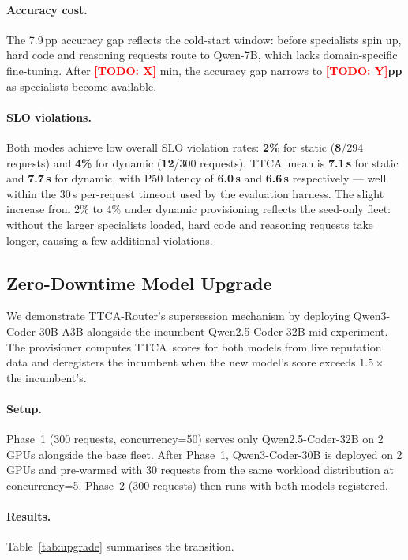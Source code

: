 \documentclass[11pt]{article}
\newcommand{\sysname}{TTCA-Router\xspace}
\newcommand{\ttca}{\textsc{TTCA}\xspace}
\newcommand{\result}[1]{\textbf{#1}}
\newcommand{\todo}[1]{\textcolor{red}{[TODO: #1]}}
\begin{document}
\paragraph{Accuracy cost.}
The 7.9\,pp accuracy gap reflects the cold-start window:
before specialists spin up, hard code and reasoning requests
route to Qwen-7B, which lacks domain-specific fine-tuning.
After \result{\todo{X}} min, the accuracy gap narrows to
\result{\todo{Y}pp} as specialists become available.

\paragraph{SLO violations.}
Both modes achieve low overall SLO violation rates:
\result{2\%} for static (\result{8}/294 requests) and \result{4\%} for dynamic
(\result{12}/300 requests).
\ttca\ mean is \result{7.1\,s} for static and \result{7.7\,s} for dynamic,
with P50 latency of \result{6.0\,s} and \result{6.6\,s} respectively —
well within the 30\,s per-request timeout used by the evaluation harness.
The slight increase from 2\% to 4\% under dynamic provisioning
reflects the seed-only fleet: without the larger specialists loaded,
hard code and reasoning requests take longer, causing a few additional violations.

\subsection{Zero-Downtime Model Upgrade}
\label{sec:eval:upgrade}

We demonstrate \sysname's supersession mechanism by deploying
Qwen3-Coder-30B-A3B alongside the incumbent Qwen2.5-Coder-32B
mid-experiment.  The provisioner computes \ttca\ scores for both
models from live reputation data and deregisters the incumbent
when the new model's score exceeds $1.5\times$ the incumbent's.

\paragraph{Setup.}
Phase~1 (300 requests, concurrency=50) serves only Qwen2.5-Coder-32B
on 2 GPUs alongside the base fleet.  After Phase~1, Qwen3-Coder-30B
is deployed on 2 GPUs and pre-warmed with 30 requests from the same
workload distribution at concurrency=5.  Phase~2 (300 requests) then
runs with both models registered.

\paragraph{Results.}
Table~\ref{tab:upgrade} summarises the transition.
\end{document}

